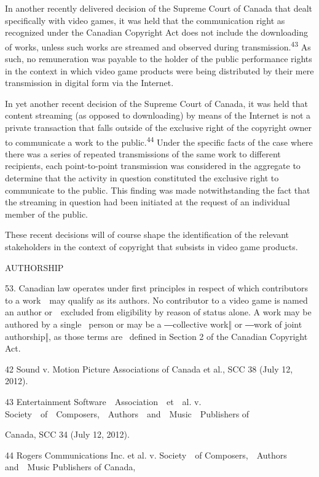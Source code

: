 \documentclass[
]{article}
\begin{document}
{In another recently delivered decision of the Supreme Court of Canada
that dealt specifically with video games, it was held that the
communication right as recognized under the Canadian }{Copyright Act
}{does not include the downloading of works, unless such works are
streamed and observed during transmission.}\textsuperscript{{43 }}{As
such, no remuneration was payable to the holder of the public
performance rights in the context in which video game products were
being distributed by their mere transmission in digital form via the
Internet.}

{In yet another recent decision of the Supreme Court of Canada, it was
held that content streaming (as opposed to downloading) by means of the
Internet is not a private transaction that falls outside of the
exclusive right of the copyright owner to communicate a work to the
public.}\textsuperscript{{44 }}{Under the specific facts of the case
where there was a series of repeated transmissions of the same work to
different recipients, each point-to-point transmission was considered in
the aggregate to determine that the activity in question constituted the
exclusive right to communicate to the public. This finding was made
notwithstanding the fact that the streaming in question had been
initiated at the request of an individual member of the public.}

{These recent decisions will of course shape the identification of the
relevant stakeholders in the context of copyright that subsists in video
game products.}

{AUTHORSHIP}

{53. }{Canadian law operates under first principles in respect of which
contributors to a work~~may qualify as its authors. No contributor to a
video game is named an author or~~excluded from eligibility by reason of
status alone. A work may be authored by a single }{~person or may be a
―collective work‖ or ―work of joint authorship‖, as those terms are
}{~defined in Section 2 of the Canadian }{Copyright Act}{.}

{42 }{Sound v. Motion Picture Associations of Canada et al.}{, SCC 38
(July 12, 2012).}

{43 }{Entertainment Software~~Association~~et~~al. v.
Society~~of~~Composers,~~Authors~~and~~Music~~Publishers of}

{Canada, }{SCC 34 (July 12, 2012).}

{44 }{Rogers Communications Inc. et al. v. Society~~of
Composers,~~Authors and~~Music Publishers of Canada,}
\end{document}
